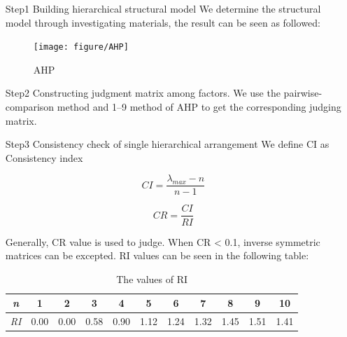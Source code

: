 \documentclass{mcmthesis}
\begin{document}
\begin{itemize}
    \item[Step1]Building hierarchical structural model
    We determine the structural model through investigating materials, the result can be seen as followed:
    
    
    \begin{figure}[h]
        \centering
        \texttt{[image: figure/AHP]}
        \caption{AHP}
        \label{fig:AHP}
    \end{figure}
    
    
    \item[Step2] Constructing judgment matrix among factors.
    We use the pairwise-comparison method and 1–9 method of AHP to get the corresponding judging matrix.
    \item[Step3] Consistency check of single hierarchical arrangement 
    We define CI as Consistency index
    

\begin{equation}CI=\!\!\frac{\lambda_{max}-n}{n-1}\end{equation}

\begin{equation}CR=\frac{CI}{RI}\end{equation}
    
    
    Generally, CR value is used to judge. When CR < 0.1, inverse symmetric matrices can be excepted. RI values can be seen in the following table:
    

\begin{table}[h] \renewcommand\arraystretch{1.5}
    \begin{center}
        \begin{footnotesize}
            \begin{tabular}{ccccccccccc}\toprule[1pt]
                \it  n & \bf 1    &\bf 2     & \bf 3  & \bf 4   &\bf 5 & \bf 6 & \bf 7 & \bf 8 & \bf 9&\bf 10   \bigstrut\\\hline
                \it RI & 0.00 &0.00 &0.58 &0.90&1.12&1.24&1.32&1.45&1.51&1.41\bigstrut\\\bottomrule[1pt]
            \end{tabular}
        \end{footnotesize}
        \caption{\footnotesize {The values of RI}}
    \end{center}
\end{table}
    

\end{itemize}
\end{document}
